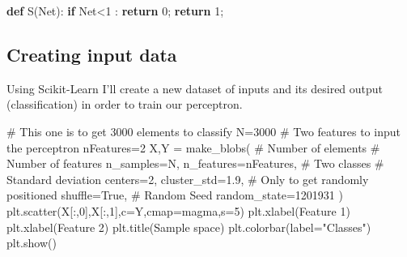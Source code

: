 \documentclass[
  letterpaper,
  DIV=11,
  numbers=noendperiod]{scrartcl}
\newenvironment{Shaded}{\begin{snugshade}}{\end{snugshade}}
\newcommand{\CommentTok}[1]{\textcolor[rgb]{0.37,0.37,0.37}{#1}}
\newcommand{\ControlFlowTok}[1]{\textcolor[rgb]{0.00,0.23,0.31}{\textbf{#1}}}
\newcommand{\DecValTok}[1]{\textcolor[rgb]{0.68,0.00,0.00}{#1}}
\newcommand{\FloatTok}[1]{\textcolor[rgb]{0.68,0.00,0.00}{#1}}
\newcommand{\KeywordTok}[1]{\textcolor[rgb]{0.00,0.23,0.31}{\textbf{#1}}}
\newcommand{\NormalTok}[1]{\textcolor[rgb]{0.00,0.23,0.31}{#1}}
\newcommand{\OperatorTok}[1]{\textcolor[rgb]{0.37,0.37,0.37}{#1}}
\newcommand{\StringTok}[1]{\textcolor[rgb]{0.13,0.47,0.30}{#1}}
\newcommand{\VariableTok}[1]{\textcolor[rgb]{0.07,0.07,0.07}{#1}}
\begin{document}
\begin{Shaded}
\begin{Highlighting}[]
\KeywordTok{def}\NormalTok{ S(Net):}
  \ControlFlowTok{if}\NormalTok{ Net}\OperatorTok{\textless{}}\DecValTok{1}\NormalTok{ :}
    \ControlFlowTok{return} \DecValTok{0}\OperatorTok{;}
  \ControlFlowTok{return} \DecValTok{1}\OperatorTok{;}
\end{Highlighting}
\end{Shaded}

\subsection{Creating input data}\label{creating-input-data}

Using Scikit-Learn I'll create a new dataset of inputs and its desired
output (classification) in order to train our perceptron.

\begin{Shaded}
\begin{Highlighting}[]
\CommentTok{\# This one is to get 3000 elements to classify}
\NormalTok{N}\OperatorTok{=}\DecValTok{3000}
\CommentTok{\# Two features to input the perceptron}
\NormalTok{nFeatures}\OperatorTok{=}\DecValTok{2}
\NormalTok{X,Y }\OperatorTok{=}\NormalTok{ make\_blobs(}
  \CommentTok{\# Number of elements  \# Number of features}
\NormalTok{  n\_samples}\OperatorTok{=}\NormalTok{N,          n\_features}\OperatorTok{=}\NormalTok{nFeatures,}
  \CommentTok{\# Two classes         \# Standard deviation}
\NormalTok{  centers}\OperatorTok{=}\DecValTok{2}\NormalTok{,            cluster\_std}\OperatorTok{=}\FloatTok{1.9}\NormalTok{,}
  \CommentTok{\# Only to get randomly positioned}
\NormalTok{  shuffle}\OperatorTok{=}\VariableTok{True}\NormalTok{,}
  \CommentTok{\# Random Seed}
\NormalTok{  random\_state}\OperatorTok{=}\DecValTok{1201931}
\NormalTok{)}
\NormalTok{plt.scatter(X[:,}\DecValTok{0}\NormalTok{],X[:,}\DecValTok{1}\NormalTok{],c}\OperatorTok{=}\NormalTok{Y,cmap}\OperatorTok{=}\StringTok{\textquotesingle{}magma\textquotesingle{}}\NormalTok{,s}\OperatorTok{=}\DecValTok{5}\NormalTok{)}
\NormalTok{plt.xlabel(}\StringTok{\textquotesingle{}Feature 1\textquotesingle{}}\NormalTok{)}
\NormalTok{plt.xlabel(}\StringTok{\textquotesingle{}Feature 2\textquotesingle{}}\NormalTok{)}
\NormalTok{plt.title(}\StringTok{\textquotesingle{}Sample space\textquotesingle{}}\NormalTok{)}
\NormalTok{plt.colorbar(label}\OperatorTok{=}\StringTok{"Classes"}\NormalTok{)}
\NormalTok{plt.show()}
\end{Highlighting}
\end{Shaded}
\end{document}
